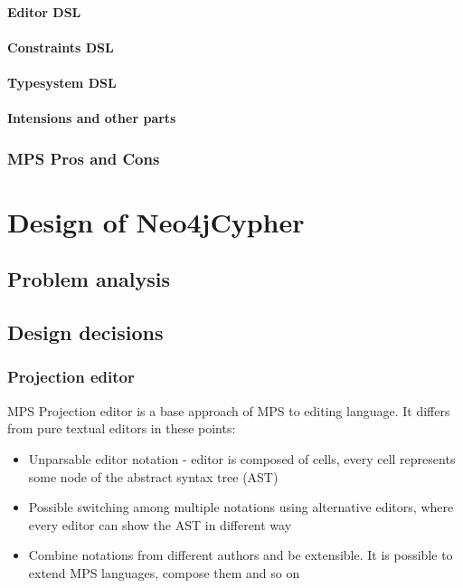 		\subsubsection{Editor DSL}
		\subsubsection{Constraints DSL}
		\subsubsection{Typesystem DSL}
		\subsubsection{Intensions and other parts}

	\subsection{MPS Pros and Cons}


\chapter{Design of Neo4jCypher}

\section{Problem analysis}

\section{Design decisions}

\subsection{Projection editor}

MPS Projection editor is a base approach of MPS to editing language. It differs from pure textual
editors in these points:

\begin{itemize}
  \item Unparsable editor notation - editor is composed of cells, every cell represents some node of
  the abstract syntax tree (AST)
  \item Possible switching among multiple notations using alternative editors, where every editor
  can show the AST in different way
  \item Combine notations from different authors and be extensible. It is possible to extend MPS
  languages, compose them and so on
\end{itemize}

